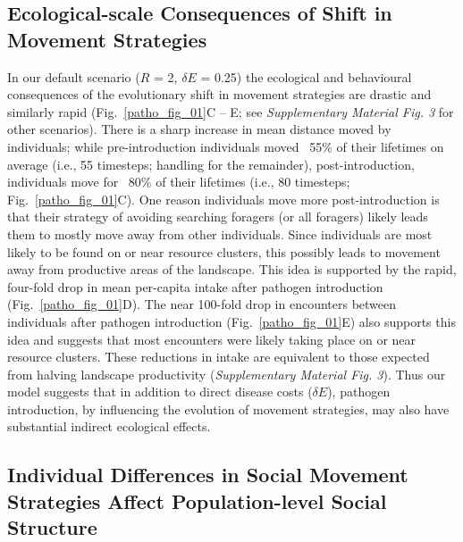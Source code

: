 \subsection*{Ecological-scale Consequences of Shift in Movement Strategies}

In our default scenario ($R$ = 2, $\delta E$ = 0.25) the ecological and behavioural consequences of the evolutionary shift in movement strategies are drastic and similarly rapid (Fig.~\ref{patho_fig_01}C -- E; see \textit{Supplementary Material Fig. 3} for other scenarios).
There is a sharp increase in mean distance moved by individuals; while pre-introduction individuals moved ~55\% of their lifetimes on average (i.e., 55 timesteps; handling for the remainder), post-introduction, individuals move for ~80\% of their lifetimes (i.e., 80 timesteps; Fig.~\ref{patho_fig_01}C).
One reason individuals move more post-introduction is that their strategy of avoiding searching foragers (or all foragers) likely leads them to mostly move away from other individuals.
Since individuals are most likely to be found on or near resource clusters, this possibly leads to movement away from productive areas of the landscape.
This idea is supported by the rapid, four-fold drop in mean per-capita intake after pathogen introduction (Fig.~\ref{patho_fig_01}D).
The near 100-fold drop in encounters between individuals after pathogen introduction (Fig.~\ref{patho_fig_01}E) also supports this idea and suggests that most encounters were likely taking place on or near resource clusters.
These reductions in intake are equivalent to those expected from halving landscape productivity (\textit{Supplementary Material Fig. 3}).
Thus our model suggests that in addition to direct disease costs ($\delta E$), pathogen introduction, by influencing the evolution of movement strategies, may also have substantial indirect ecological effects.

\subsection*{Individual Differences in Social Movement Strategies Affect Population-level Social Structure}

